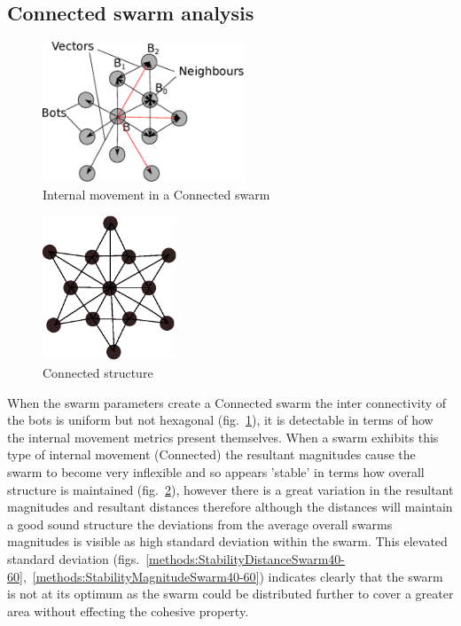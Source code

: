 \documentclass[10pt,journal,letterpaper,twoside]{IEEEtran}
\newcommand{\swarmB}{Connected}
\newcommand{\stability}{internal movement}
\newcommand{\Stability}{Internal movement}
\newcommand{\Fig}{fig.}
\newcommand{\Figs}{figs.}
\begin{document}
\subsection{\swarmB{} swarm analysis}

\begin{figure}[H]
\begin{center}
\includegraphics[width=6cm]{figures/CrushedStability}
\end{center}
\caption{\Stability{} in a \swarmB{} swarm} \label{methods:CrushedStability1}
\end{figure}

\begin{figure}[H]
\begin{center}
\includegraphics[width=4cm]{figures/StableFormsCompressed}
\end{center}
\caption{\swarmB{} structure} \label{methods:StableSwarmCompressed}
\end{figure}

When the swarm parameters create a \swarmB{} swarm the inter
connectivity of the bots is uniform but not hexagonal
(\Fig{}~\ref{methods:CrushedStability1}), it is detectable in terms of
how the \stability{} metrics present themselves. When a swarm exhibits
this type of \stability{} (\swarmB{}) the resultant magnitudes cause
the swarm to become very inflexible and so appears 'stable' in terms
how overall structure is maintained
(\Fig{}~\ref{methods:StableSwarmCompressed}), however there is a great
variation in the resultant magnitudes and resultant distances
therefore although the distances will maintain a good sound structure
the deviations from the average overall swarms magnitudes is visible
as high standard deviation within the swarm.  This elevated standard
deviation
(\Figs{}~\ref{methods:StabilityDistanceSwarm40-60},~\ref{methods:StabilityMagnitudeSwarm40-60})
indicates clearly that the swarm is not at its optimum as the swarm
could be distributed further to cover a greater area without effecting
the cohesive property.
\end{document}

